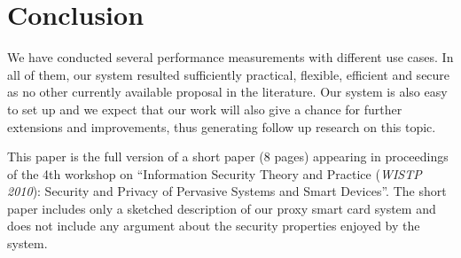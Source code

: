 \documentclass[preprint,authoryear,12pt]{elsarticle}
\newcommand{\User}{\ensuremath{\mathsf{U}}}
\newcommand{\Proxy}{\ensuremath{\mathsf{P}}}
\newcommand{\SC}{\ensuremath{\mathsf{SC}}}
\begin{document}
%


\section{Conclusion}
\label{conclusion}
We have conducted several performance measurements with different use cases. In all of them, our system resulted sufficiently practical, flexible, efficient and secure as no other currently available proposal in the literature.
Our system is also easy to set up and we expect that our work will also give a chance for further extensions and improvements, thus generating follow up research on this topic.

This paper is the full version of a short paper (8 pages) appearing in proceedings of the 4th
workshop on ``Information Security Theory and Practice  ({\em WISTP 2010}): Security and Privacy of Pervasive Systems and Smart Devices''.
The short paper includes only a sketched description of our proxy smart card system and does not include any argument about 
 the security properties enjoyed by the system.




%

%
\end{document}
